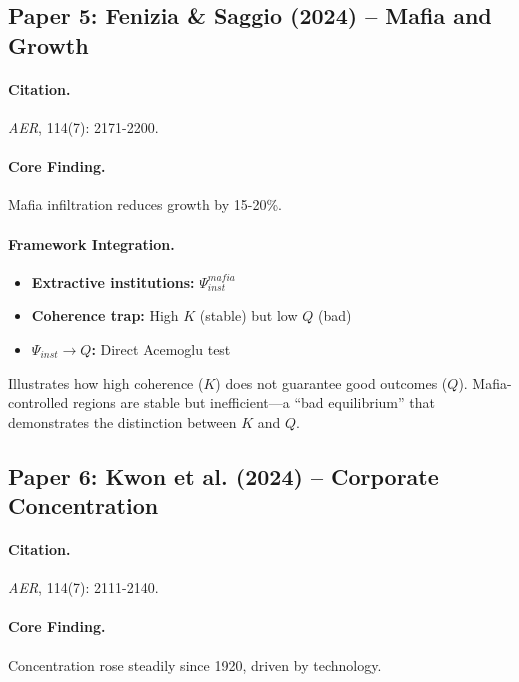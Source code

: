 \subsection{Paper 5: Fenizia \& Saggio (2024) -- Mafia and Growth}

\paragraph{Citation.}
\emph{AER}, 114(7): 2171-2200.

\paragraph{Core Finding.}
Mafia infiltration reduces growth by 15-20\%.

\paragraph{Framework Integration.}
\begin{itemize}
  \item \textbf{Extractive institutions:} $\Psi_{inst}^{mafia}$
  \item \textbf{Coherence trap:} High $K$ (stable) but low $Q$ (bad)
  \item \textbf{$\Psi_{inst} \to Q$:} Direct Acemoglu test
\end{itemize}

\begin{tcolorbox}[colback=yellow!5!white, colframe=yellow!75!black,
    title=EBF Insight: Extractive Institutions]
Illustrates how high coherence ($K$) does not guarantee good outcomes ($Q$).
Mafia-controlled regions are stable but inefficient---a ``bad equilibrium''
that demonstrates the distinction between $K$ and $Q$.
\end{tcolorbox}


\subsection{Paper 6: Kwon et al. (2024) -- Corporate Concentration}

\paragraph{Citation.}
\emph{AER}, 114(7): 2111-2140.

\paragraph{Core Finding.}
Concentration rose steadily since 1920, driven by technology.

